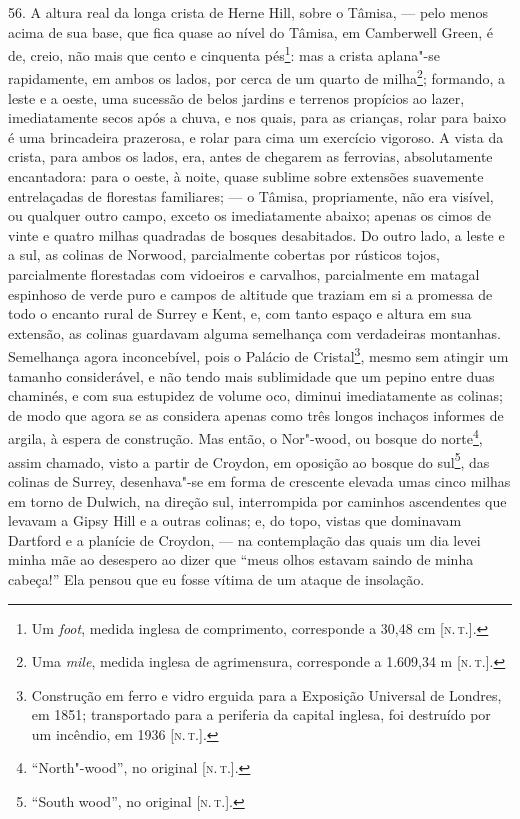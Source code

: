 56. A altura real da longa crista de Herne Hill, sobre o Tâmisa, --- pelo
menos acima de sua base, que fica quase ao nível do Tâmisa, em
Camberwell Green, é de, creio, não mais que cento e cinquenta
pés\footnote{Um \emph{foot}, medida inglesa de comprimento, corresponde
  a 30,48 cm {[}\textsc{n.\,t.}{]}.}: mas a crista aplana"-se rapidamente, em
ambos os lados, por cerca de um quarto de milha\footnote{Uma
  \emph{mile}, medida inglesa de agrimensura, corresponde a 1.609,34 m
  {[}\textsc{n.\,t.}{]}.}; formando, a leste e a oeste, uma sucessão de belos
jardins e terrenos propícios ao lazer, imediatamente secos após a chuva,
e nos quais, para as crianças, rolar para baixo é uma brincadeira
prazerosa, e rolar para cima um exercício vigoroso. A vista da crista,
para ambos os lados, era, antes de chegarem as ferrovias, absolutamente
encantadora: para o oeste, à noite, quase sublime sobre extensões
suavemente entrelaçadas de florestas familiares; --- o Tâmisa,
propriamente, não era visível, ou qualquer outro campo, exceto os
imediatamente abaixo; apenas os cimos de vinte e quatro milhas quadradas
de bosques desabitados. Do outro lado, a leste e a sul, as colinas de
Norwood, parcialmente cobertas por rústicos tojos, parcialmente
florestadas com vidoeiros e carvalhos, parcialmente em matagal espinhoso
de verde puro e campos de altitude que traziam em si a promessa de todo
o encanto rural de Surrey e Kent, e, com tanto espaço e altura em sua
extensão, as colinas guardavam alguma semelhança com verdadeiras
montanhas. Semelhança agora inconcebível, pois o Palácio de
Cristal\footnote{Construção em ferro e vidro erguida para a Exposição
  Universal de Londres, em 1851; transportado para a periferia da
  capital inglesa, foi destruído por um incêndio, em 1936 {[}\textsc{n.\,t.}{]}.}, mesmo sem atingir um tamanho considerável, e não tendo mais
sublimidade que um pepino entre duas chaminés, e com sua estupidez de
volume oco, diminui imediatamente as colinas; de modo que agora se as
considera apenas como três longos inchaços informes de argila, à espera
de construção. Mas então, o Nor"-wood, ou bosque do norte\footnote{``North"-wood'',
  no original {[}\textsc{n.\,t.}{]}.}, assim chamado, visto a partir de
Croydon, em oposição ao bosque do sul\footnote{``South wood'', no
  original {[}\textsc{n.\,t.}{]}.}, das colinas de Surrey, desenhava"-se em
forma de crescente elevada umas cinco milhas em torno de Dulwich, na
direção sul, interrompida por caminhos ascendentes que levavam a Gipsy
Hill e a outras colinas; e, do topo, vistas que dominavam Dartford e a
planície de Croydon, --- na contemplação das quais um dia levei minha mãe
ao desespero ao dizer que ``meus olhos estavam saindo de minha cabeça!''
Ela pensou que eu fosse vítima de um ataque de insolação.

